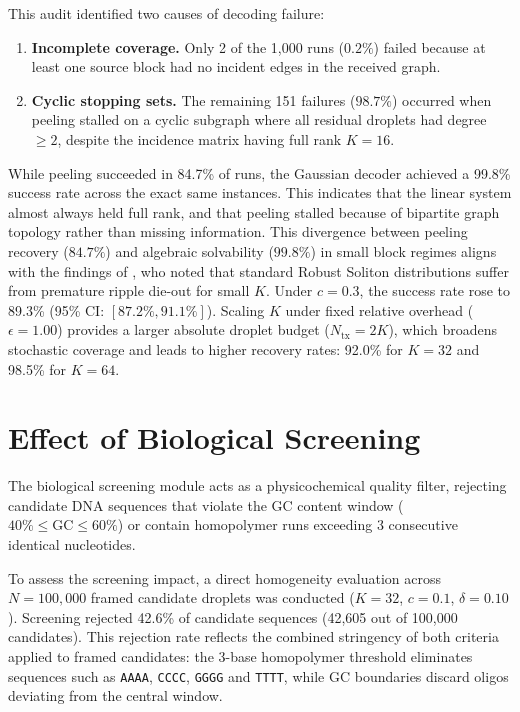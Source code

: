 This audit identified two causes of decoding failure:
\begin{enumerate}
    \item \textbf{Incomplete coverage.} Only 2 of the 1,000 runs ($0.2\%$) failed because at least one source block had no incident edges in the received graph.
    \item \textbf{Cyclic stopping sets.} The remaining 151 failures ($98.7\%$) occurred when peeling stalled on a cyclic subgraph where all residual droplets had degree $\ge 2$, despite the incidence matrix having full rank $K=16$.
\end{enumerate}
While peeling succeeded in 84.7\% of runs, the Gaussian decoder achieved a 99.8\% success rate across the exact same instances. This indicates that the linear system almost always held full rank, and that peeling stalled because of bipartite graph topology rather than missing information. This divergence between peeling recovery ($84.7\%$) and algebraic solvability ($99.8\%$) in small block regimes aligns with the findings of , who noted that standard Robust Soliton distributions suffer from premature ripple die-out for small $K$. Under $c = 0.3$, the success rate rose to 89.3\% (95\% CI: $[87.2\%, 91.1\%]$). Scaling $K$ under fixed relative overhead ($\epsilon = 1.00$) provides a larger absolute droplet budget ($N_{\text{tx}} = 2K$), which broadens stochastic coverage and leads to higher recovery rates: 92.0\% for $K = 32$ and 98.5\% for $K = 64$.

\section{Effect of Biological Screening}
\label{sec:results_biological_screening}
The biological screening module acts as a physicochemical quality filter, rejecting candidate DNA sequences that violate the GC content window ($40\% \le \text{GC} \le 60\%$) or contain homopolymer runs exceeding 3 consecutive identical nucleotides.

To assess the screening impact, a direct homogeneity evaluation across $N = 100{,}000$ framed candidate droplets was conducted ($K = 32$, $c = 0.1$, $\delta = 0.10$). Screening rejected 42.6\% of candidate sequences (42,605 out of 100,000 candidates). This rejection rate reflects the combined stringency of both criteria applied to framed candidates: the 3-base homopolymer threshold eliminates sequences such as \texttt{AAAA}, \texttt{CCCC}, \texttt{GGGG} and \texttt{TTTT}, while GC boundaries discard oligos deviating from the central window.

